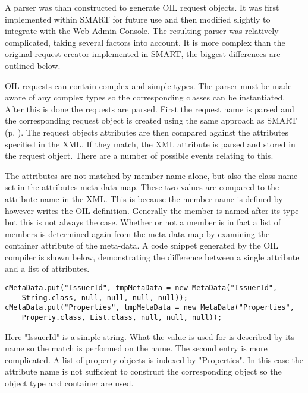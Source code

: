 \documentclass[a4paper, 11pt, titlepage]{article}
\begin{document}
A parser was than constructed to generate OIL request objects. It was first implemented within SMART for future use and then modified slightly to integrate with the Web Admin Console. The resulting parser was relatively complicated, taking several factors into account. It is more complex than the original request creator implemented in SMART, the biggest differences are outlined below. 
 
OIL requests can contain complex and simple types. The parser must be made aware of any complex types so the corresponding classes can be instantiated. After this is done the requests are parsed. First the request name is parsed and the corresponding request object is created using the same approach as SMART (p. \pageref{smart_dynamic_create}). The request objects attributes are then compared against the attributes specified in the XML. If they match, the XML attribute is parsed and stored in the request object. There are a number of possible events relating to this. 
 
The attributes are not matched by member name alone, but also the class name set in the attributes meta-data map. These two values are compared to the attribute name in the XML. This is because the member name is defined by however writes the OIL definition. Generally the member is named after its type but this is not always the case. Whether or not a member is in fact a list of members is determined again from the meta-data map by examining the container attribute of the meta-data. A code snippet generated by the OIL compiler is shown below, demonstrating the difference between a single attribute and a list of attributes. 
 
\begin{verbatim} 
cMetaData.put("IssuerId", tmpMetaData = new MetaData("IssuerId",
    String.class, null, null, null, null)); 
cMetaData.put("Properties", tmpMetaData = new MetaData("Properties",
    Property.class, List.class, null, null, null)); 
\end{verbatim} 

Here "IssuerId" is a simple string. What the value is used for is described by its name so the match is performed on the name. The second entry is more complicated. A list of property objects is indexed by "Properties". In this case the attribute name is not sufficient to construct the corresponding object so the object type and container are used.
 
\end{document}
